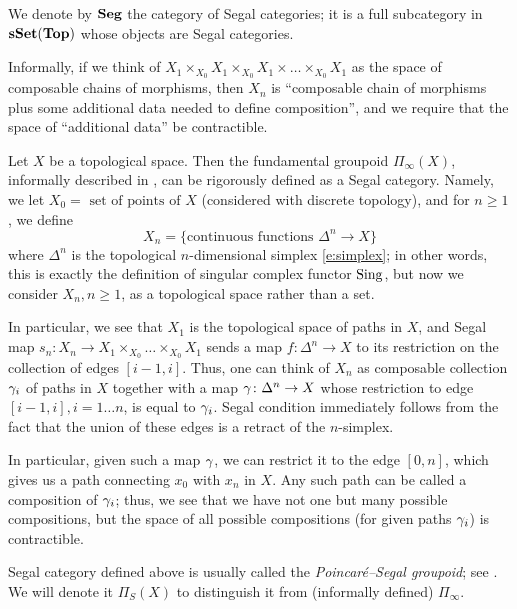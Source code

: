 We denote by $\mathbf{Seg}$ the category of Segal categories; it is a full subcategory
in $\mathbf{sSet}(\mathbf{Top})$ whose objects are Segal categories.

Informally, if we think of $X_1\times_{X_0} X_1\times_{X_0} X_1
\times\dots \times_{X_0} X_1$ as the space of composable chains of morphisms,
then $X_n$ is ``composable chain of morphisms plus some additional data needed
to define composition'', and we require that the space of ``additional data'' be
contractible.

\begin{example}\label{x:poincare-segal}
  Let $X$ be a topological space. Then the fundamental groupoid
  $\Pi_{\infty}(X)$, informally described in ,
  can be rigorously defined as a Segal category. Namely, we let
  $X_0=\text{ set of points of $X$}$ (considered with discrete topology),
  and for $n\ge 1$, we define
  $$
    X_n= \{\text{continuous functions $\Delta^n\to X$}\}
  $$
  where $\Delta^n$ is the topological $n$-dimensional simplex \eqref{e:simplex};
  in other words, this is exactly the definition of singular complex functor
  $\operatorname{Sing}$, but now we consider $X_n, n\ge 1$, as a topological space rather
  than a set.

  In particular, we see that $X_1$ is the topological space of paths in $X$, and
  Segal map $s_n\colon X_n \to X_1\times_{X_0}\dots\times_{X_0} X_1$ sends a map
  $f\colon \Delta^n\to X$ to its restriction on the collection of edges $[i-1,
  i]$. Thus, one can think of $X_n$ as composable collection $\gamma_i$ of paths in
  $X$ together with a map $\gamma \colon \Delta^n\to X$ whose restriction to edge
  $[i-1, i], i=1\dots n$, is equal to $\gamma_i$. Segal condition immediately
  follows from the fact that the union of these edges is a retract of the
  $n$-simplex.

  In particular, given such a map $\gamma$, we can restrict it to the edge $[0,n]$,
  which gives us a path connecting $x_0$ with $x_n$ in $X$. Any such path can be
  called a composition of $\gamma_i$; thus, we see that we have not one but many
  possible compositions, but the space of all possible compositions (for given
  paths $\gamma_i$) is contractible.

  Segal category defined above is usually called the \emph{Poincar\'e--Segal
  groupoid}; see \cite[Sections 15.2, 15.3]{simpson}. We will denote it
  $\Pi_S(X)$ to distinguish it from (informally defined) $\Pi_{\infty}$.

\end{example}

